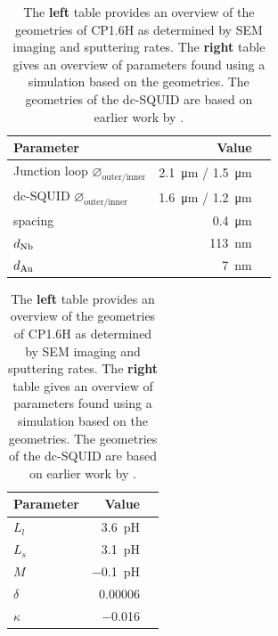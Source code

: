 \begin{table}
	\begin{subtable}{.7\linewidth}
		\begin{tabular}[t]{@{}lrr@{}}
			\toprule
			Parameter & Value \\ \midrule
			Junction loop $\diameter_{\text{outer/inner}}$ & \qty{2.1}{\micro\meter} / \qty{1.5}{\micro\meter} \\
			dc-SQUID $\diameter_{\text{outer/inner}}$ & \qty{1.6}{\micro\meter} / \qty{1.2}{\micro\meter} \\
			spacing & \qty{0.4}{\micro\meter} \\
			$d_{\ce{Nb}}$ & \qty{113}{\nano\meter} \\
			$d_{\ce{Au}}$ & \qty{7}{\nano\meter} \\
			\bottomrule
		\end{tabular}
    \end{subtable}
    \hfill
    \begin{subtable}{.3\linewidth}
    	\flushright
    	\begin{tabular}[t]{@{}lrr@{}}
    		\toprule
    		Parameter & Value \\ \midrule
    		$L_{l}$ & \qty{3.6}{\pico\henry} \\
			$L_{s}$ & \qty{3.1}{\pico\henry} \\
			$M$ & \qty{-0.1}{\pico\henry} \\
			$\delta$ & \num{0.00006} \\
			$\kappa$ & \num{-0.016} \\
    		\bottomrule
    	\end{tabular}
    \end{subtable}
    \caption{The \textbf{left} table provides an overview of the geometries of CP1.6H as determined by SEM imaging and sputtering rates. The \textbf{right} table gives an overview of parameters found using a simulation based on the geometries. The geometries of the dc-SQUID are based on earlier work by \citeauthor{rogSQUIDontipMagneticMicroscopy2022} \citeyear{rogSQUIDontipMagneticMicroscopy2022}.}
    \label{tab:CP1.6H-geometries}
\end{table}